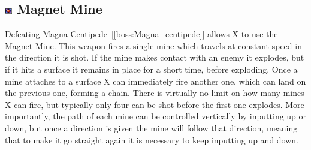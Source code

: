 \subsection{\includegraphics[width=12px, height=10px]{figures/X2/weapons/M_mine.png} Magnet Mine}\label{Magnet_mine}
Defeating Magna Centipede~[\ref{boss:Magna_centipede}] allows X to use the Magnet Mine. This weapon fires a single mine which travels at constant speed in the direction it is shot. If the mine makes contact with an enemy it explodes, but if it hits a surface it remains in place for a short time, before exploding. Once a mine attaches to a surface X can immediately fire another one, which can land on the previous one, forming a chain. There is virtually no limit on how many mines X can fire, but typically only four can be shot before the first one explodes. More importantly, the path of each mine can be controlled vertically by inputting up or down, but once a direction is given the mine will follow that direction, meaning that to make it go straight again it is necessary to keep inputting up and down.
